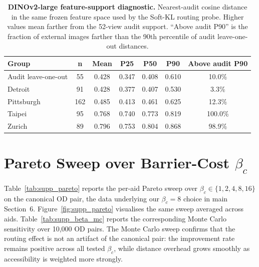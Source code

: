\documentclass[conference]{IEEEtran}
\begin{document}
\begin{table}[!t]
\caption{\textbf{DINOv2-large feature-support diagnostic.} Nearest-audit cosine distance in the same frozen feature space used by the Soft-KL routing probe. Higher values mean farther from the 52-view audit support. ``Above audit P90'' is the fraction of external images farther than the 90th percentile of audit leave-one-out distances.}
\label{tab:supp_visual_support}
\centering\scriptsize
\setlength{\tabcolsep}{5pt}
\begin{tabular}{@{}lcccccc@{}}
\toprule
\textbf{Group} & \textbf{n} & \textbf{Mean} & \textbf{P25} & \textbf{P50} & \textbf{P90} & \textbf{Above audit P90} \\
\midrule
Audit leave-one-out & 55  & 0.428 & 0.347 & 0.408 & 0.610 & 10.0\% \\
Detroit             & 91  & 0.428 & 0.377 & 0.407 & 0.530 & 3.3\% \\
Pittsburgh          & 162 & 0.485 & 0.413 & 0.461 & 0.625 & 12.3\% \\
Taipei              & 95  & 0.768 & 0.740 & 0.773 & 0.819 & 100.0\% \\
Zurich              & 89  & 0.796 & 0.753 & 0.804 & 0.868 & 98.9\% \\
\bottomrule
\end{tabular}
\end{table}

\FloatBarrier
\section[Barrier-Cost Pareto Sweep]{Pareto Sweep over Barrier-Cost $\beta_c$}
\label{sec:supp_pareto}

Table~\ref{tab:supp_pareto} reports the per-aid Pareto sweep over $\beta_c \in \{1,2,4,8,16\}$ on the canonical OD pair, the data underlying our $\beta_c = 8$ choice in main Section~6. Figure~\ref{fig:supp_pareto} visualises the same sweep averaged across aids. Table~\ref{tab:supp_beta_mc} reports the corresponding Monte Carlo sensitivity over 10,000 OD pairs. The Monte Carlo sweep confirms that the routing effect is not an artifact of the canonical pair: the improvement rate remains positive across all tested $\beta_c$, while distance overhead grows smoothly as accessibility is weighted more strongly.
\end{document}
